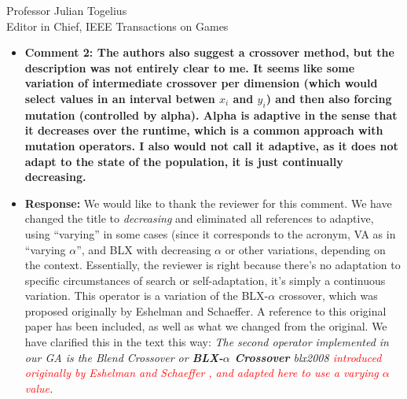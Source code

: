 \documentclass[10pt]{letter} %
\begin{document}
\begin{letter}{Professor Julian Togelius \\ Editor in Chief, IEEE Transactions on Games}
\begin{enumerate}
\begin{itemize}
%		 
		\item {\bf   Comment 2:	The authors also suggest a crossover method, but the description was not entirely clear to me. It seems like some variation of intermediate crossover per dimension (which would select values in an interval betwen $x_i$ and $y_i$) and then also forcing mutation (controlled by alpha). Alpha is adaptive in the sense that it decreases over the runtime, which is a common approach with mutation operators. I also would not call it adaptive, as it does not adapt to the state of the population, it is just continually decreasing.}
		\item {\bf Response:}
		We would like to thank the reviewer for this comment.
                We have changed the title to {\em decreasing} and eliminated all references to adaptive, using ``varying'' in some cases (since it corresponds to the acronym, VA as in ``varying $\alpha$'', and BLX with decreasing $\alpha$ or other variations, depending on the context. Essentially, the reviewer is right because there's no adaptation to specific circumstances of search or self-adaptation, it's simply a continuous variation. This operator is a variation of the BLX-$\alpha$ crossover, which was proposed originally by Eshelman and Schaeffer. A reference to this original paper has been included, as well as what we changed from the original. We have clarified this in the text this way: {\em The second operator implemented in our GA is the Blend Crossover or \textbf{BLX-$\alpha$ Crossover} {\sf blx2008} \textcolor{red}{introduced originally by Eshelman and Schaeffer \cite{eshelman1993real}, and adapted here to use a varying $\alpha$ value}.}


\end{itemize}
\end{enumerate}
\end{letter}
\end{document}
